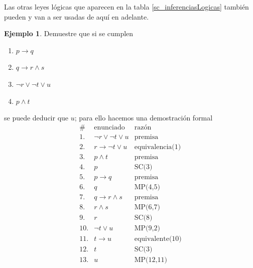 \documentclass{book}
\theoremstyle{definition}
\newtheorem{ejm}{Ejemplo}[chapter]
\begin{document}
Las otras leyes lógicas que aparecen en la tabla \ref{sc_inferenciasLogicas} también pueden y van a ser usadas de aquí en adelante.

\begin{ejm}
	Demuestre que si se cumplen \begin{enumerate}
		\item $p \rightarrow q$
		\item $q\rightarrow r\wedge s$
		\item $\neg r \vee \neg t \vee u$
		\item $p\wedge t$
	\end{enumerate} 
	se puede deducir que $u$; para ello hacemos una demostración formal
	\begin{align*}
		\# \, & \text{enunciado} & \text{razón}\\
		1.& \neg r \vee \neg t \vee u & \text{premisa}\\
		2.& r \rightarrow \neg t \vee u & \text{equivalencia(1)}\\
		3.& p \wedge t & \text{premisa}\\
		4.& p & \text{SC(3)}\\
		5.& p \rightarrow q & \text{premisa}\\
		6.& q & \text{MP(4,5)}\\
		7.& q\rightarrow r\wedge s & \text{premisa}\\
		8.& r \wedge s & \text{MP(6,7)}\\
		9.& r & \text{SC(8)}\\
		10.&\neg t \vee u & \text{MP(9,2)}\\
		11.&t \rightarrow u & \text{equivalente(10)}\\
		12.&t & \text{SC(3)}\\
		13.&u & \text{MP(12,11)}
	\end{align*}
\end{ejm}
\end{document}
